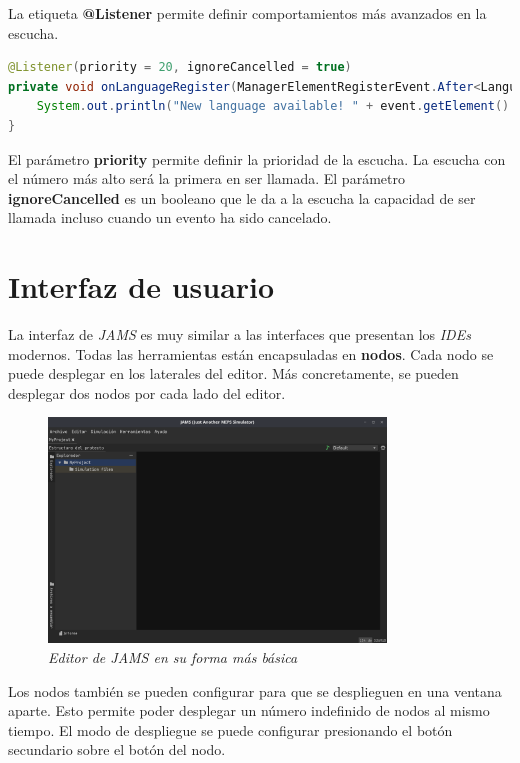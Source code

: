 La etiqueta \textbf{@Listener} permite definir comportamientos más avanzados en la escucha.

\begin{lstlisting}[language=Java,style=java,frame=single,label={lst:escuchas-avanzadas}]
@Listener(priority = 20, ignoreCancelled = true)
private void onLanguageRegister(ManagerElementRegisterEvent.After<Language> event) {
    System.out.println("New language available! " + event.getElement().getName());
}
\end{lstlisting}

\noindent El parámetro \textbf{priority} permite definir la prioridad de la escucha.
La escucha con el número más alto será la primera en ser llamada.
El parámetro \textbf{ignoreCancelled} es un booleano que le da a la escucha la capacidad
de ser llamada incluso cuando un evento ha sido cancelado.


\section{Interfaz de usuario}\label{sec:interfaz-de-usuario}

La interfaz de \textit{JAMS} es muy similar a las interfaces que presentan los \textit{IDEs} modernos.
Todas las herramientas están encapsuladas en \textbf{nodos}.
Cada nodo se puede desplegar en los laterales del editor.
Más concretamente, se pueden desplegar dos nodos por cada lado del editor.

\begin{figure}[H]
    \centering
    \includegraphics[width=0.8\textwidth]{images/base/jams-basic}
    \caption{\textit{Editor de \textit{JAMS} en su forma más básica}}
    \label{fig:jams-basic}
\end{figure}

\noindent Los nodos también se pueden configurar para que se desplieguen en una ventana aparte.
Esto permite poder desplegar un número indefinido de nodos al mismo tiempo.
El modo de despliegue se puede configurar presionando el botón secundario sobre
el botón del nodo.

